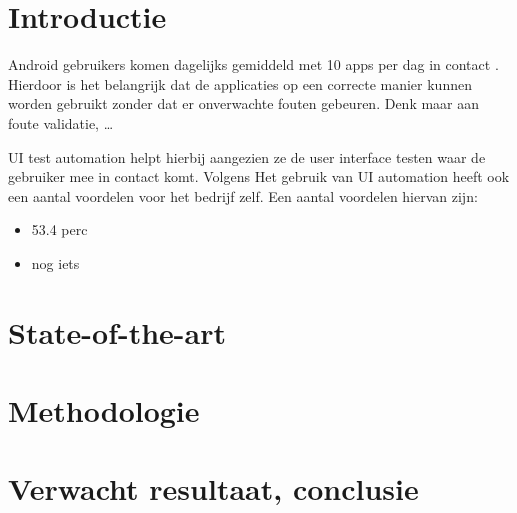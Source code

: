\newcommand{\uiTestAut}{UI test automation}



\section{Introductie}%
\label{sec:introductie}

Android gebruikers komen dagelijks gemiddeld met 10 apps per dag in contact \autocite{PANKO2018} . 
Hierdoor is het belangrijk dat de applicaties op een correcte manier kunnen worden gebruikt zonder 
dat er onverwachte fouten gebeuren. Denk maar aan foute validatie, \dots{} %

UI test automation helpt hierbij aangezien ze de user interface testen waar de gebruiker mee in contact komt.
Volgens \textcite{Microfocus} Het gebruik van UI automation heeft ook een aantal voordelen voor het bedrijf zelf.
Een aantal voordelen hiervan zijn:
\begin{itemize}
\item 53.4 perc 
\item nog iets

\end{itemize}


\section{State-of-the-art}%
\label{sec:state-of-the-art}



\section{Methodologie}%
\label{sec:methodologie}


\section{Verwacht resultaat, conclusie}%
\label{sec:verwachte_resultaten}


